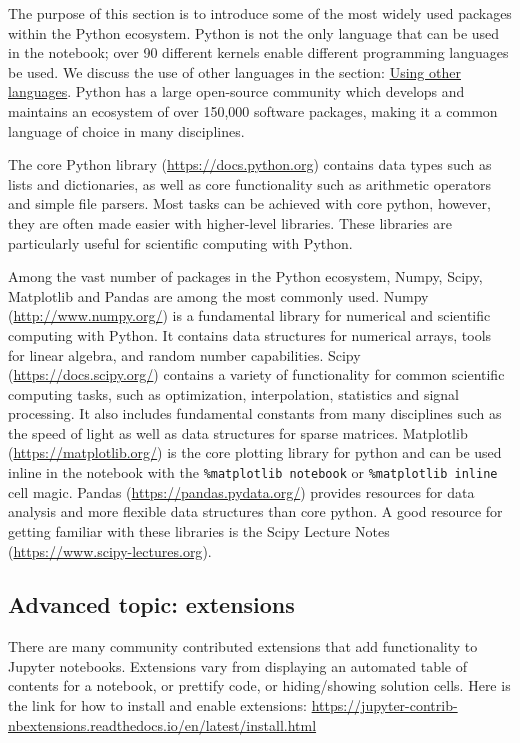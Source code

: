 \documentclass[]{book}
\begin{document}
The purpose of this section is to introduce some of the most widely used
packages within the Python ecosystem. Python is not the only language
that can be used in the notebook; over 90 different kernels enable
different programming languages be used. We discuss the use of other
languages in the section:
\protect\hyperlink{using-other-languages}{Using other languages}. Python
has a large open-source community which develops and maintains an
ecosystem of over 150,000 software packages, making it a common language
of choice in many disciplines.

The core Python library
(\href{https://docs.python.org/3/}{https://docs.python.org}) contains
data types such as lists and dictionaries, as well as core functionality
such as arithmetic operators and simple file parsers. Most tasks can be
achieved with core python, however, they are often made easier with
higher-level libraries. These libraries are particularly useful for
scientific computing with Python.

Among the vast number of packages in the Python ecosystem, Numpy, Scipy,
Matplotlib and Pandas are among the most commonly used. Numpy
(\url{http://www.numpy.org/}) is a fundamental library for numerical and
scientific computing with Python. It contains data structures for
numerical arrays, tools for linear algebra, and random number
capabilities. Scipy (\url{https://docs.scipy.org/}) contains a variety
of functionality for common scientific computing tasks, such as
optimization, interpolation, statistics and signal processing. It also
includes fundamental constants from many disciplines such as the speed
of light as well as data structures for sparse matrices. Matplotlib
(\url{https://matplotlib.org/}) is the core plotting library for python
and can be used inline in the notebook with the
\texttt{\%matplotlib\ notebook} or \texttt{\%matplotlib\ inline} cell
magic. Pandas (\url{https://pandas.pydata.org/}) provides resources for
data analysis and more flexible data structures than core python. A good
resource for getting familiar with these libraries is the Scipy Lecture
Notes (\url{https://www.scipy-lectures.org}).

\subsection{Advanced topic: extensions}\label{advanced-topic-extensions}

There are many community contributed extensions that add functionality
to Jupyter notebooks. Extensions vary from displaying an automated table
of contents for a notebook, or prettify code, or hiding/showing solution
cells. Here is the link for how to install and enable extensions:
\url{https://jupyter-contrib-nbextensions.readthedocs.io/en/latest/install.html}
\end{document}
